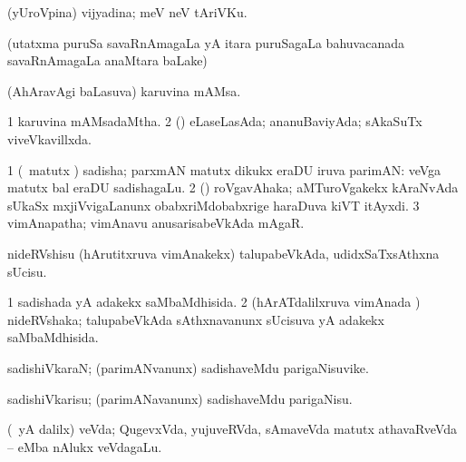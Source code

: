 \bentry
{}
\gl{\nA}
\expl{}
\bmng
(yUroVpina) vijyadina; meV neV tAriVKu. 
\emng
\eentry

\bentry
{} 
\gl{\saMkiSx}
\expl{}
\bmng
 (utatxma puruSa savaRnAmagaLa yA itara puruSagaLa bahuvacanada savaRnAmagaLa anaMtara baLake)  
\emng
\eentry

\bentry
{} 
\gl{\nA}
\expl{}
\bmng
 (AhAravAgi baLasuva) karuvina mAMsa. 
\emng
\eentry

\bentry
{} 
\gl{}
\expl{}
\bmng
\bnum
\num{1} karuvina mAMsadaMtha. 
\num{2} (\rUpa) eLaseLasAda; ananuBaviyAda; sAkaSuTx viveVkavillxda. 
\enum
\emng
\eentry

\bentry
{} 
\gl{\nA}
\expl{}
\bmng
\bnum
\num{1} (\Bwvi\ matutx \ga) sadisha; parxmAN matutx dikukx eraDU iruva parimAN:  veVga matutx bal eraDU sadishagaLu. 
\num{2} (\veYshA) roVgavAhaka; aMTuroVgakekx kAraNvAda sUkaSx mxjiVvigaLanunx obabxriMdobabxrige haraDuva kiVT itAyxdi. 
\num{3} vimAnapatha; vimAnavu anusarisabeVkAda mAgaR. 
\enum
\emng
\eentry

\bentry
{} 
\gl{\sakirx}
\expl{}
\bmng
 nideRVshisu (hArutitxruva vimAnakekx) talupabeVkAda, udidxSaTxsAthxna sUcisu. 
\emng
\eentry

\bentry
{} 
\gl{\gu}
\expl{}
\bmng
\bnum
\num{1} sadishada yA adakekx saMbaMdhisida. 
\num{2} (hArATdalilxruva vimAnada \vi) nideRVshaka; talupabeVkAda sAthxnavanunx sUcisuva yA adakekx saMbaMdhisida. 
\enum
\emng
\eentry

\bentry
{} 
\gl{\sakirx}
\expl{}
\bmng
\emng
\eentry

\bentry
{} 
\gl{\nA}
\expl{}
\bmng
 sadishiVkaraN; (parimANvanunx) sadishaveMdu parigaNisuvike. 
\emng
\eentry

\bentry
{} 
\gl{\sakirx}
\expl{}
\bmng
 sadishiVkarisu; (parimANavanunx) sadishaveMdu parigaNisu. 
\emng
\eentry

\bentry
{} 
\gl{\nA}
\expl{}
\bmng
 (\Eva\ yA \bava dalilx) veVda; QugevxVda, yujuveRVda, sAmaveVda matutx athavaRveVda -- eMba nAlukx veVdagaLu. 
\emng
\eentry

